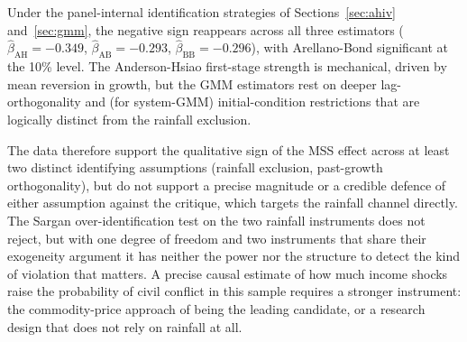 \documentclass[11pt,a4paper]{article}
\begin{document}
Under the panel-internal identification strategies of
Sections~\ref{sec:ahiv} and~\ref{sec:gmm}, the negative sign reappears
across all three estimators ($\hat\beta_{\text{AH}} = -0.349$,
$\hat\beta_{\text{AB}} = -0.293$, $\hat\beta_{\text{BB}} = -0.296$),
with Arellano-Bond significant at the 10\% level. The
Anderson-Hsiao first-stage strength is mechanical, driven by mean
reversion in growth, but the GMM estimators rest on deeper
lag-orthogonality and (for system-GMM) initial-condition restrictions
that are logically distinct from the rainfall exclusion.

The data therefore support the qualitative sign of the MSS effect
across at least two distinct identifying assumptions (rainfall
exclusion, past-growth orthogonality), but do not support a precise
magnitude or a credible defence of either assumption against the
\citet{Sarsons2015} critique, which targets the rainfall channel
directly. The Sargan over-identification test on the two rainfall
instruments does not reject, but with one degree of freedom and two
instruments that share their exogeneity argument it has neither the
power nor the structure to detect the kind of violation that matters.
A precise causal estimate of how much income shocks raise the
probability of civil conflict in this sample requires a stronger
instrument: the commodity-price approach of
\citet{BrucknerCiccone2010} being the leading candidate, or a
research design that does not rely on rainfall at all.
\end{document}
